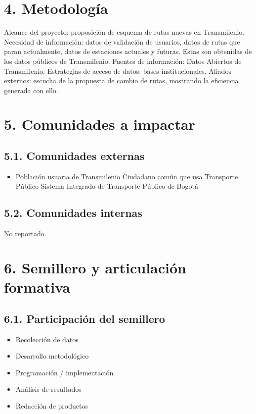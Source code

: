 \documentclass[a4paper,12pt]{article}
\begin{document}
\section*{4. Metodología}
Alcance del proyecto: proposición de esquema de rutas nuevas en Transmilenio. Necesidad de información: datos de validación de usuarios, datos de rutas que paran actualmente, datos de estaciones actuales y futuras. Estas son obtenidas de los datos públicos de Transmilenio. Fuentes de información: Datos Abiertos de Transmilenio. Estrategias de acceso de datos: bases institucionales. Aliados externos: escucha de la propuesta de cambio de rutas, mostrando la eficiencia generada con ello.

\section*{5. Comunidades a impactar}
\subsection*{5.1. Comunidades externas}
\begin{itemize}
    \item Población usuaria de Transmilenio Ciudadano común que usa Transporte Público Sistema Integrado de Transporte Público de Bogotá
\end{itemize}

\subsection*{5.2. Comunidades internas}
No reportado.

\section*{6. Semillero y articulación formativa}
\subsection*{6.1. Participación del semillero}
\begin{itemize}
    \item Recolección de datos
    \item Desarrollo metodológico
    \item Programación / implementación
    \item Análisis de resultados
    \item Redacción de productos
\end{itemize}
\end{document}
